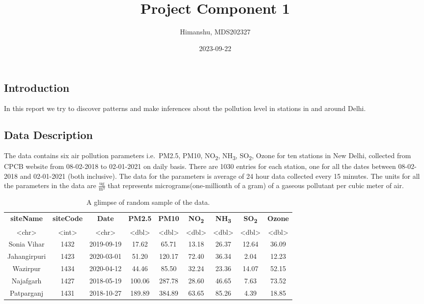 \documentclass[
]{article}
\title{Project Component 1}
\author{Himanshu, MDS202327}
\date{2023-09-22}
\begin{document}
\maketitle

\hypertarget{introduction}{%
\subsection{Introduction}\label{introduction}}

In this report we try to discover patterns and make inferences about the
pollution level in stations in and around Delhi.

\hypertarget{data-description}{%
\subsection{Data Description}\label{data-description}}

The data contains six air pollution parameters i.e.~PM2.5, PM10,
NO\textsubscript{2}, NH\textsubscript{3}, SO\textsubscript{2}, Ozone for
ten stations in New Delhi, collected from CPCB website from 08-02-2018
to 02-01-2021 on daily basis. There are 1030 entries for each station,
one for all the dates between 08-02-2018 and 02-01-2021 (both
inclusive). The data for the parameters is average of 24 hour data
collected every 15 minutes. The units for all the parameters in the data
are \(\frac{\text{ug}}{\text{m}^3}\) that represents
micrograms(one-millionth of a gram) of a gaseous pollutant per cubic
meter of air.

\begin{table}[h!]
\centering
\begin{tabular}{|c|c|c|c|c|c|c|c|c|}
  \hline
  \textbf{siteName}&\textbf{siteCode}&\textbf{Date}&\textbf{PM2.5}&\textbf{PM10}&\textbf{NO\textsubscript{2}}&\textbf{NH\textsubscript{3}}&\textbf{SO\textsubscript{2}}&\textbf{Ozone}\\
  {\scriptsize<chr>}&{\scriptsize<int>}&{\scriptsize<chr>}&{\scriptsize<dbl>}&{\scriptsize<dbl>}&{\scriptsize<dbl>}&{\scriptsize<dbl>}&{\scriptsize<dbl>}&{\scriptsize<dbl>}\\ \hline
  Sonia Vihar&1432&2019-09-19&17.62&65.71&13.18&26.37&12.64&36.09\\[1.05ex] \hline
  Jahangirpuri&1423&2020-03-01&51.20&120.17&72.40&36.34&2.04&12.23\\[1.05ex] \hline
  Wazirpur&1434&2020-04-12&44.46&85.50&32.24&23.36&14.07&52.15\\[1.05ex] \hline      
  Najafgarh&1427&2018-05-19&100.06&287.78&28.60&46.65&7.63&73.52\\[1.05ex] \hline
  Patparganj&1431&2018-10-27&189.89&384.89&63.65&85.26&4.39&18.85\\[1.05ex] \hline
\end{tabular}
\caption{A glimpse of random sample of the data.}
\end{table}
\end{document}
